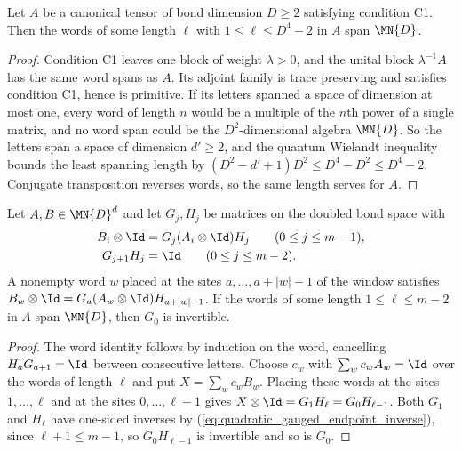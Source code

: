 \begin{lemma}
    \label{lem:quadratic_window_spanning_length}
    \leanok
    Let $A$ be a canonical tensor of bond dimension $D\ge2$ satisfying
    condition C1. Then the words of some length $\ell$ with
    $1\le\ell\le D^4-2$ in $A$ span $\MN{D}$.
\end{lemma}
\begin{proof}
    \leanok
    Condition C1 leaves one block of weight $\lambda>0$, and the unital
    block $\lambda^{-1}A$ has the same word spans as $A$. Its adjoint
    family is trace preserving and satisfies condition C1, hence is
    primitive. If its letters spanned a space of dimension at most one,
    every word of length $n$ would be a multiple of the $n$th power of a
    single matrix, and no word span could be the $D^2$-dimensional
    algebra $\MN{D}$. So the letters span a space of dimension $d'\ge2$,
    and the quantum Wielandt inequality bounds the least spanning length
    by $(D^2-d'+1)D^2\le D^4-D^2\le D^4-2$. Conjugate transposition
    reverses words, so the same length serves for $A$.
\end{proof}

\begin{lemma}
    \label{lem:quadratic_gauged_endpoint}
    \leanok
    Let $A,B\in\MN{D}^d$ and let $G_j,H_j$ be matrices on the doubled bond
    space with
    \begin{align}
        B_i\otimes\Id & =G_j(A_i\otimes\Id)H_j \qquad(0\le j\le m-1),
        \label{eq:quadratic_gauged_endpoint_system}                   \\
        G_{j+1}H_j    & =\Id \qquad(0\le j\le m-2).
        \label{eq:quadratic_gauged_endpoint_inverse}
    \end{align}
    A nonempty word $w$ placed at the sites $a,\ldots,a+|w|-1$ of the
    window satisfies $B_w\otimes\Id=G_a(A_w\otimes\Id)H_{a+|w|-1}$. If the
    words of some length $1\le\ell\le m-2$ in $A$ span $\MN{D}$, then $G_0$
    is invertible.
\end{lemma}
\begin{proof}
    \leanok
    The word identity follows by induction on the word, cancelling
    $H_aG_{a+1}=\Id$ between consecutive letters. Choose $c_w$ with
    $\sum_wc_wA_w=\Id$ over the words of length $\ell$ and put
    $X=\sum_wc_wB_w$. Placing these words at the sites $1,\ldots,\ell$ and
    at the sites $0,\ldots,\ell-1$ gives
    $X\otimes\Id=G_1H_\ell=G_0H_{\ell-1}$. Both $G_1$ and $H_\ell$ have
    one-sided inverses by (\ref{eq:quadratic_gauged_endpoint_inverse}),
    since $\ell+1\le m-1$, so $G_0H_{\ell-1}$ is invertible and so is $G_0$.
\end{proof}

